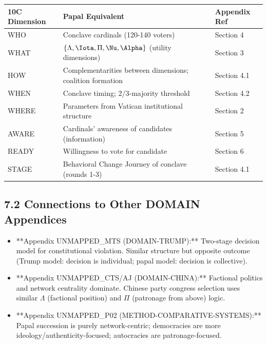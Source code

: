 \begin{table}[h]
\centering
\begin{tabular}{|l|l|l|}
\hline
\textbf{10C Dimension} & \textbf{Papal Equivalent} & \textbf{Appendix Ref} \\
\hline
WHO & Conclave cardinals (120-140 voters) & Section 4 \\
WHAT & $\{\Lambda, \Iota, \Pi, \Nu, \Alpha\}$ (utility dimensions) & Section 3 \\
HOW & Complementarities between dimensions; coalition formation & Section 4.1 \\
WHEN & Conclave timing; 2/3-majority threshold & Section 4.2 \\
WHERE & Parameters from Vatican institutional structure & Section 2 \\
AWARE & Cardinals' awareness of candidates (information) & Section 5 \\
READY & Willingness to vote for candidate & Section 6 \\
STAGE & Behavioral Change Journey of conclave (rounds 1-3) & Section 4.1 \\
\hline
\end{tabular}
\end{table}

\subsection{7.2 Connections to Other DOMAIN Appendices}

\begin{itemize}
\item **Appendix UNMAPPED_MTS (DOMAIN-TRUMP):** Two-stage decision model for constitutional violation. Similar structure but opposite outcome (Trump model: decision is individual; papal model: decision is collective).

\item **Appendix UNMAPPED_CTS/AJ (DOMAIN-CHINA):** Factional politics and network centrality dominate. Chinese party congress selection uses similar $\Lambda$ (factional position) and $\Pi$ (patronage from above) logic.

\item **Appendix UNMAPPED_P02 (METHOD-COMPARATIVE-SYSTEMS):** Papal succession is purely network-centric; democracies are more ideology/authenticity-focused; autocracies are patronage-focused.
\end{itemize}


